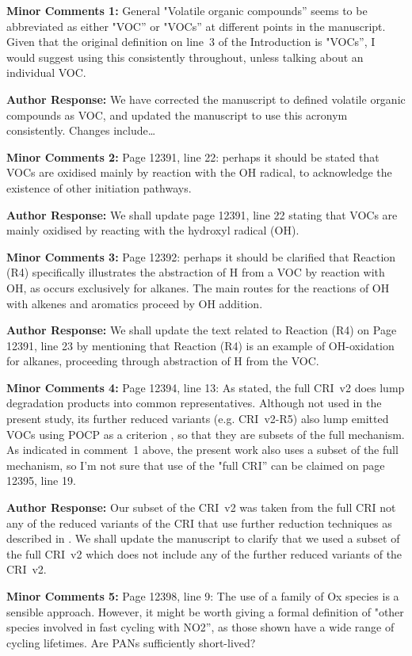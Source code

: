 \documentclass{article}
\begin{document}
\textbf{Minor Comments 1:} General "Volatile organic compounds'' seems to be abbreviated as either "VOC'' or "VOCs'' at different points in the manuscript. Given that the original definition on line~3 of the Introduction is "VOCs'', I would suggest using this consistently throughout, unless talking about an individual VOC.

\textbf{Author Response:} We have corrected the manuscript to defined volatile organic compounds as VOC, and updated the manuscript to use this acronym consistently. Changes include\ldots

\textbf{Minor Comments 2:} Page 12391, line 22: perhaps it should be stated that VOCs are oxidised mainly by reaction with the OH radical, to acknowledge the existence of other initiation pathways.

\textbf{Author Response:} We shall update page 12391, line 22 stating that VOCs are mainly oxidised by reacting with the hydroxyl radical (OH).

\textbf{Minor Comments 3:} Page 12392: perhaps it should be clarified that Reaction (R4) specifically illustrates the abstraction of H from a VOC by reaction with OH, as occurs exclusively for alkanes. The main routes for the reactions of OH with alkenes and aromatics proceed by OH addition.

\textbf{Author Response:} We shall update the text related to Reaction (R4) on Page 12391, line 23 by mentioning that Reaction (R4) is an example of OH-oxidation for alkanes, proceeding through abstraction of H from the VOC.

\textbf{Minor Comments 4:} Page 12394, line 13: As stated, the full CRI~v2 does lump degradation products into common representatives. Although not used in the present study, its further reduced variants (e.g. CRI~v2-R5) also lump emitted VOCs using POCP as a criterion \citep{Watson:2008}, so that they are subsets of the full mechanism. As indicated in comment~1 above, the present work also uses a subset of the full mechanism, so I’m not sure that use of the "full CRI'' can be claimed on page 12395, line 19.

\textbf{Author Response:} Our subset of the CRI~v2 was taken from the full CRI not any of the reduced variants of the CRI that use further reduction techniques as described in \citet{Watson:2008}.
We shall update the manuscript to clarify that we used a subset of the full CRI~v2 which does not include any of the further reduced variants of the CRI~v2.

\textbf{Minor Comments 5:} Page 12398, line 9: The use of a family of Ox species is a sensible approach. However, it might be worth giving a formal definition of "other species involved in fast cycling with NO2'', as those shown have a wide range of cycling lifetimes. Are PANs sufficiently short-lived?
\end{document}
